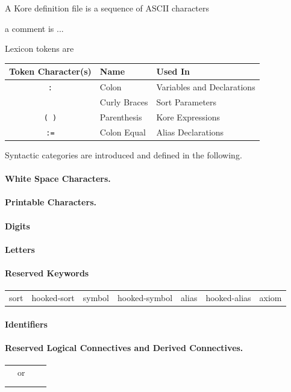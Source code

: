 \documentclass[UTF8,11pt]{article}
\theoremstyle{plain}
\theoremstyle{definition}
\theoremstyle{remark}
\DeclarePairedDelimiter{\ceil}{\lceil}{\rceil}
\DeclarePairedDelimiter{\floor}{\lfloor}{\rfloor}
\newcommand{\smalltt}[1]{\texttt{\small #1} }
\newcommand{\sland}{\smalltt{\string\and}}
\newcommand{\slnot}{\smalltt{\string\not}}
\newcommand{\slimplies}{\smalltt{\string\implies}}
\newcommand{\sliff}{\smalltt{\string\iff}}
\newcommand{\slequals}{\smalltt{\string\equals}}
\newcommand{\slexists}{\smalltt{\string\exists}}
\newcommand{\slforall}{\smalltt{\string\forall}}
\newcommand{\sltop}{\smalltt{\string\top}}
\newcommand{\slbottom}{\smalltt{\string\bottom}}
\newcommand{\slceil}{\smalltt{\string\ceil}}
\newcommand{\slfloor}{\smalltt{\string\floor}}
\begin{document}
A Kore definition file is a sequence of ASCII characters

a comment is ...


Lexicon tokens are
\begin{center}
	\begin{tabular}{c|l|l}
		\textbf{Token Character(s)} & \textbf{Name} & \textbf{Used In}
		\\\hline
		\texttt{:} & Colon & Variables and Declarations
		\\
		\texttt{\string{ \string}} & Curly Braces & Sort Parameters
		\\
		\texttt{( )} & Parenthesis & Kore Expressions
		\\
		\texttt{:=} & Colon Equal & Alias Declarations
	\end{tabular}
\end{center}

Syntactic categories are introduced and defined in the following.

\paragraph{White Space Characters.}
\paragraph{Printable Characters.}
\paragraph{Digits}
\paragraph{Letters}

\paragraph{Reserved Keywords}
\begin{center}
	{\ttfamily
		\begin{tabular}{lllllll}
			sort & hooked-sort & symbol & hooked-symbol & alias & hooked-alias &
			axiom
	\end{tabular}}
\end{center}

\paragraph{Identifiers}
\paragraph{Reserved Logical Connectives and Derived Connectives.}
\begin{center}
	\begin{tabular}{llll}
		\sland & or & \slexists & \slforall \\
		\slnot & \slimplies & \sliff & \slequals \\
		\slceil & \slfloor & \sltop & \slbottom
	\end{tabular}
\end{center}
\end{document}
